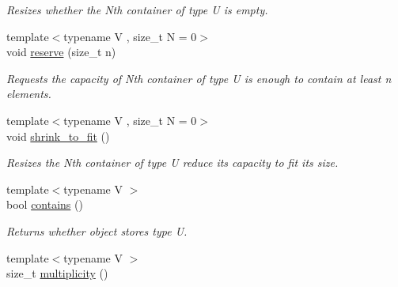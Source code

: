 \begin{DoxyCompactItemize}
\begin{DoxyCompactList}\small\item\em Resizes whether the Nth container of type U is empty. \end{DoxyCompactList}\item 
\hypertarget{classheterogeneous_1_1heterovector_3_01_t_00_01_u_00_01_types_8_8_8_4_adb4ae3e2dc48d85ed14cfb1f9d2825ea}{}{\footnotesize template$<$typename V , size\+\_\+t N = 0$>$ }\\void \hyperlink{classheterogeneous_1_1heterovector_3_01_t_00_01_u_00_01_types_8_8_8_4_adb4ae3e2dc48d85ed14cfb1f9d2825ea}{reserve} (size\+\_\+t n)\label{classheterogeneous_1_1heterovector_3_01_t_00_01_u_00_01_types_8_8_8_4_adb4ae3e2dc48d85ed14cfb1f9d2825ea}

\begin{DoxyCompactList}\small\item\em Requests the capacity of Nth container of type U is enough to contain at least n elements. \end{DoxyCompactList}\item 
\hypertarget{classheterogeneous_1_1heterovector_3_01_t_00_01_u_00_01_types_8_8_8_4_afb14af2e6e8d63a20f093624f048d769}{}{\footnotesize template$<$typename V , size\+\_\+t N = 0$>$ }\\void \hyperlink{classheterogeneous_1_1heterovector_3_01_t_00_01_u_00_01_types_8_8_8_4_afb14af2e6e8d63a20f093624f048d769}{shrink\+\_\+to\+\_\+fit} ()\label{classheterogeneous_1_1heterovector_3_01_t_00_01_u_00_01_types_8_8_8_4_afb14af2e6e8d63a20f093624f048d769}

\begin{DoxyCompactList}\small\item\em Resizes the Nth container of type U reduce its capacity to fit its size. \end{DoxyCompactList}\item 
\hypertarget{classheterogeneous_1_1heterovector_3_01_t_00_01_u_00_01_types_8_8_8_4_ae166efc791657ac14aa68bc45eb794e5}{}{\footnotesize template$<$typename V $>$ }\\bool \hyperlink{classheterogeneous_1_1heterovector_3_01_t_00_01_u_00_01_types_8_8_8_4_ae166efc791657ac14aa68bc45eb794e5}{contains} ()\label{classheterogeneous_1_1heterovector_3_01_t_00_01_u_00_01_types_8_8_8_4_ae166efc791657ac14aa68bc45eb794e5}

\begin{DoxyCompactList}\small\item\em Returns whether object stores type U. \end{DoxyCompactList}\item 
\hypertarget{classheterogeneous_1_1heterovector_3_01_t_00_01_u_00_01_types_8_8_8_4_a28d1e10738c3897a86b638abbdd35b05}{}{\footnotesize template$<$typename V $>$ }\\size\+\_\+t \hyperlink{classheterogeneous_1_1heterovector_3_01_t_00_01_u_00_01_types_8_8_8_4_a28d1e10738c3897a86b638abbdd35b05}{multiplicity} ()\label{classheterogeneous_1_1heterovector_3_01_t_00_01_u_00_01_types_8_8_8_4_a28d1e10738c3897a86b638abbdd35b05}


\end{DoxyCompactItemize}
